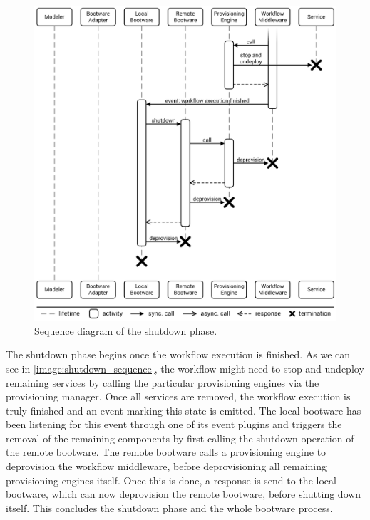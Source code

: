 \begin{figure}[!htbp]
	\centering
	\includegraphics[resolution=600]{process/assets/shutdown_sequence}
	\caption{Sequence diagram of the shutdown phase.}
	\label{image:shutdown_sequence}
\end{figure}

The shutdown phase begins once the workflow execution is finished.
As we can see in \autoref{image:shutdown_sequence}, the workflow might need to stop and undeploy remaining services by calling the particular provisioning engines via the provisioning manager.
Once all services are removed, the workflow execution is truly finished and an event marking this state is emitted.
The local bootware has been listening for this event through one of its event plugins and triggers the removal of the remaining components by first calling the shutdown operation of the remote bootware.
The remote bootware calls a provisioning engine to deprovision the workflow middleware, before deprovisioning all remaining provisioning engines itself.
Once this is done, a response is send to the local bootware, which can now deprovision the remote bootware, before shutting down itself.
This concludes the shutdown phase and the whole bootware process.
